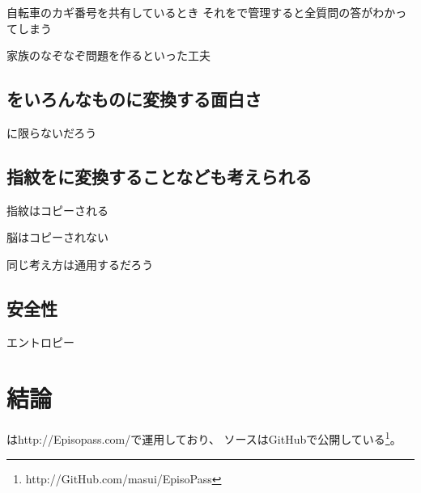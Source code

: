 \documentclass[twoside]{wiss}
\begin{document}
自転車のカギ番号を共有しているとき
それを{\EP}で管理すると全質問の答がわかってしまう

家族のなぞなぞ問題を作るといった工夫

\subsection{{\EM}をいろんなものに変換する面白さ}

{\PW}に限らないだろう

\subsection{指紋を{\PW}に変換することなども考えられる}

指紋はコピーされる

脳はコピーされない

同じ考え方は通用するだろう

\subsection{安全性}

エントロピー


\section{結論}

{\EP}は\textsf{http://Episopass.com/}で運用しており、
ソースはGitHubで公開している\footnote{
  \textsf{http://GitHub.com/masui/EpisoPass}
}。



\end{document}
